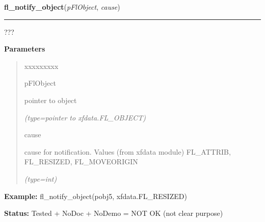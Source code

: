    \label{xformslib:flbasic:fl_notify_object}

    \vspace{0.5ex}

\hspace{.8\funcindent}\begin{boxedminipage}{\funcwidth}

    \raggedright \textbf{fl\_notify\_object}(\textit{pFlObject}, \textit{cause})

    \vspace{-1.5ex}

    \rule{\textwidth}{0.5\fboxrule}
\setlength{\parskip}{2ex}
    ???

\setlength{\parskip}{1ex}
      \textbf{Parameters}
      \vspace{-1ex}

      \begin{quote}
        \begin{Ventry}{xxxxxxxxx}

          \item[pFlObject]

          pointer to object

            {\it (type=pointer to xfdata.FL\_OBJECT)}

          \item[cause]

          cause for notification. Values (from xfdata module) FL\_ATTRIB, 
          FL\_RESIZED, FL\_MOVEORIGIN

            {\it (type=int)}

        \end{Ventry}

      \end{quote}

\textbf{Example:} fl\_notify\_object(pobj5, xfdata.FL\_RESIZED)



\textbf{Status:} Tested + NoDoc + NoDemo = NOT OK (not clear purpose)



    \end{boxedminipage}

    \label{xformslib:flbasic:fl_set_object_lalign}

    \vspace{0.5ex}

